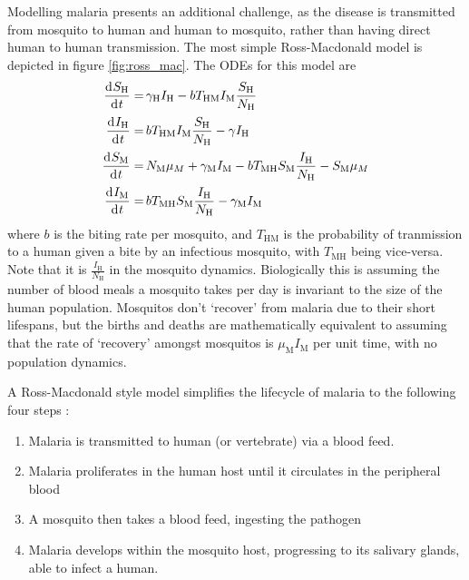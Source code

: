 Modelling malaria presents an additional challenge, as the disease is
transmitted from mosquito to human and human to mosquito, rather than having
direct human to human transmission. The most simple Ross-Macdonald model is
depicted in figure \ref{fig:ross_mac}. The ODEs for this model are
\begin{align*}
    \frac{\diff S_\mathrm{H}}{\diff t}
    = & \, \gamma_\mathrm{H}I_\mathrm{H}
    - bT_{\mathrm{HM}}I_\mathrm{M}\frac{S_\mathrm{H}}{N_\mathrm{H}}      \\
    \frac{\diff I_\mathrm{H}}{\diff t}
    = & \, bT_{\mathrm{HM}}I_\mathrm{M}\frac{S_\mathrm{H}}{N_\mathrm{H}}
    - \gamma I_\mathrm{H}                                                \\
    \frac{\diff S_\mathrm{M}}{\diff t}
    = & \, N_\mathrm{M}\mu_M + \gamma_\mathrm{M}I_\mathrm{M}
    - bT_{\mathrm{MH}}S_\mathrm{M}\frac{I_\mathrm{H}}{N_\mathrm{H}}
    - S_\mathrm{M}\mu_M                                                  \\
    \frac{\diff I_\mathrm{M}}{\diff t}
    = & \, bT_{\mathrm{MH}}S_\mathrm{M}\frac{I_\mathrm{H}}{N_\mathrm{H}}
    - \gamma_\mathrm{M}I_\mathrm{M}
\end{align*}
where $b$ is the biting rate per mosquito, and $T_{\mathrm{HM}}$ is the
probability of tranmission to a human given a bite by an infectious mosquito,
with $T_{\mathrm{MH}}$ being vice-versa. Note that it is
$\frac{I_\mathrm{H}}{N_\mathrm{H}}$ in the mosquito dynamics. Biologically this
is assuming the number of blood meals a mosquito takes per day is invariant to
the size of the human population. Mosquitos don't `recover' from malaria due to
their short lifespans, but the births and deaths are mathematically equivalent
to assuming that the rate of `recovery' amongst mosquitos is
$\mu_\mathrm{M}I_\mathrm{M}$ per unit time, with no population dynamics.

A Ross-Macdonald style model simplifies the lifecycle of malaria to the
following four steps \parencite{smith_ross_2012}: \begin{enumerate}
    \item Malaria is transmitted to human (or vertebrate) via a blood feed.
    \item Malaria proliferates in the human host until it circulates in the
          peripheral blood
    \item A mosquito then takes a blood feed, ingesting the pathogen
    \item Malaria develops within the mosquito host, progressing to its
          salivary glands, able to infect a human.
\end{enumerate}

